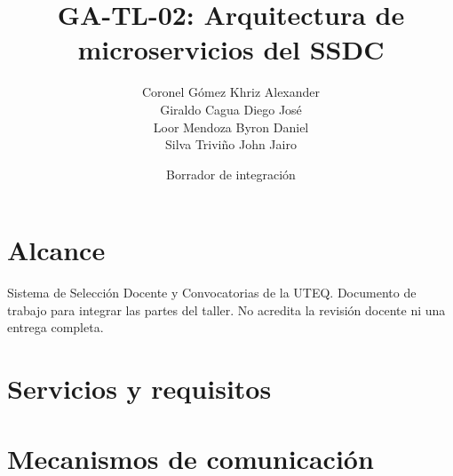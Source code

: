 \documentclass[11pt,a4paper]{article}
\title{GA-TL-02: Arquitectura de microservicios del SSDC}
\author{Coronel Gómez Khriz Alexander\\Giraldo Cagua Diego José\\Loor Mendoza Byron Daniel\\Silva Triviño John Jairo}
\date{Borrador de integración}
\begin{document}
\maketitle
\section*{Alcance}
Sistema de Selección Docente y Convocatorias de la UTEQ. Documento de trabajo para integrar las partes del taller. No acredita la revisión docente ni una entrega completa.
\section*{Servicios y requisitos}

\section*{Mecanismos de comunicación}

\clearpage

\end{document}
